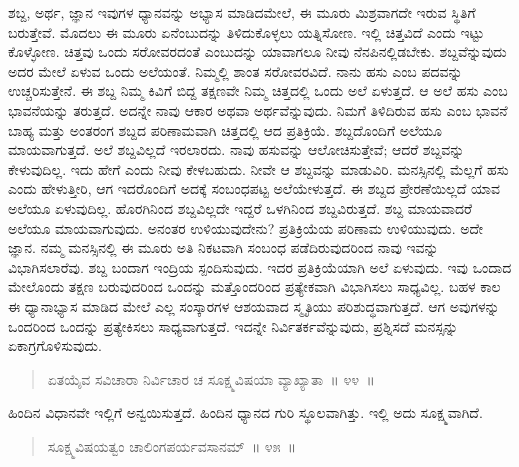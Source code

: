 ಶಬ್ದ, ಅರ್ಥ, ಜ್ಞಾನ ಇವುಗಳ ಧ್ಯಾನವನ್ನು ಅಭ್ಯಾಸ ಮಾಡಿದಮೇಲೆ, ಈ ಮೂರು ಮಿಶ್ರವಾಗದೇ ಇರುವ ಸ್ಥಿತಿಗೆ ಬರುತ್ತೇವೆ. ಮೊದಲು ಈ ಮೂರು ಏನೆಂಬುದನ್ನು ತಿಳಿದುಕೊಳ್ಳಲು ಯತ್ನಿಸೋಣ. ಇಲ್ಲಿ ಚಿತ್ತವಿದೆ ಎಂದು ಇಟ್ಟು ಕೊಳ್ಳೋಣ. ಚಿತ್ತವು ಒಂದು ಸರೋವರದಂತೆ ಎಂಬುದನ್ನು ಯಾವಾಗಲೂ ನೀವು ನೆನಪಿನಲ್ಲಿಡಬೇಕು. ಶಬ್ದವೆನ್ನುವುದು ಅದರ ಮೇಲೆ ಏಳುವ ಒಂದು ಅಲೆಯಂತೆ. ನಿಮ್ಮಲ್ಲಿ ಶಾಂತ ಸರೋವರವಿದೆ. ನಾನು ಹಸು ಎಂಬ ಪದವನ್ನು ಉಚ್ಚರಿಸುತ್ತೇನೆ. ಈ ಶಬ್ದ ನಿಮ್ಮ ಕಿವಿಗೆ ಬಿದ್ದ ತಕ್ಷಣವೇ ನಿಮ್ಮ ಚಿತ್ತದಲ್ಲಿ ಒಂದು ಅಲೆ ಏಳುತ್ತದೆ. ಆ ಅಲೆ ಹಸು ಎಂಬ ಭಾವನೆಯನ್ನು ತರುತ್ತದೆ. ಅದನ್ನೇ ನಾವು ಆಕಾರ ಅಥವಾ ಅರ್ಥವೆನ್ನುವುದು. ನಿಮಗೆ ತಿಳಿದಿರುವ ಹಸು ಎಂಬ ಭಾವನೆ ಬಾಹ್ಯ ಮತ್ತು ಅಂತರಂಗ ಶಬ್ದದ ಪರಿಣಾಮವಾಗಿ ಚಿತ್ತದಲ್ಲಿ ಆದ ಪ್ರತಿಕ್ರಿಯೆ. ಶಬ್ದದೊಂದಿಗೆ ಅಲೆಯೂ ಮಾಯವಾಗುತ್ತದೆ. ಅಲೆ ಶಬ್ದವಿಲ್ಲದೆ ಇರಲಾರದು. ನಾವು ಹಸುವನ್ನು ಆಲೋಚಿಸುತ್ತೇವೆ; ಆದರೆ ಶಬ್ದವನ್ನು ಕೇಳುವುದಿಲ್ಲ. ಇದು ಹೇಗೆ ಎಂದು ನೀವು ಕೇಳಬಹುದು. ನೀವೇ ಆ ಶಬ್ದವನ್ನು ಮಾಡುವಿರಿ. ಮನಸ್ಸಿನಲ್ಲಿ ಮೆಲ್ಲಗೆ ಹಸು ಎಂದು ಹೇಳುತ್ತೀರಿ, ಆಗ ಇದರೊಂದಿಗೆ ಅದಕ್ಕೆ ಸಂಬಂಧಪಟ್ಟ ಅಲೆಯೇಳುತ್ತದೆ. ಈ ಶಬ್ದದ ಪ್ರೇರಣೆಯಿಲ್ಲದೆ ಯಾವ ಅಲೆಯೂ ಏಳುವುದಿಲ್ಲ. ಹೊರಗಿನಿಂದ ಶಬ್ದವಿಲ್ಲದೇ ಇದ್ದರೆ ಒಳಗಿನಿಂದ ಶಬ್ದವಿರುತ್ತದೆ. ಶಬ್ದ ಮಾಯವಾದರೆ ಅಲೆಯೂ ಮಾಯವಾಗುವುದು. ಅನಂತರ ಉಳಿಯುವುದೇನು? ಪ್ರತಿಕ್ರಿಯೆಯ ಪರಿಣಾಮ ಉಳಿಯುವುದು. ಅದೇ ಜ್ಞಾನ. ನಮ್ಮ ಮನಸ್ಸಿನಲ್ಲಿ ಈ ಮೂರು ಅತಿ ನಿಕಟವಾಗಿ ಸಂಬಂಧ ಪಡೆದಿರುವುದರಿಂದ ನಾವು ಇವನ್ನು ವಿಭಾಗಿಸಲಾರೆವು. ಶಬ್ದ ಬಂದಾಗ ಇಂದ್ರಿಯ ಸ್ಪಂದಿಸುವುದು. ಇದರ ಪ್ರತಿಕ್ರಿಯೆಯಾಗಿ ಅಲೆ ಏಳುವುದು. ಇವು ಒಂದಾದ ಮೇಲೊಂದು ತಕ್ಷಣ ಬರುವುದರಿಂದ ಒಂದನ್ನು ಮತ್ತೊಂದರಿಂದ ಪ್ರತ್ಯೇಕವಾಗಿ ವಿಭಾಗಿಸಲು ಸಾಧ್ಯವಿಲ್ಲ. ಬಹಳ ಕಾಲ ಈ ಧ್ಯಾನಾಭ್ಯಾಸ ಮಾಡಿದ ಮೇಲೆ ಎಲ್ಲ ಸಂಸ್ಕಾರಗಳ ಆಶಯವಾದ ಸ್ಮೃತಿಯು ಪರಿಶುದ್ಧವಾಗುತ್ತದೆ. ಆಗ ಅವುಗಳನ್ನು ಒಂದರಿಂದ ಒಂದನ್ನು ಪ್ರತ್ಯೇಕಿಸಲು ಸಾಧ್ಯವಾಗುತ್ತದೆ. ಇದನ್ನೇ ನಿರ್ವಿತರ್ಕವೆನ್ನುವುದು, ಪ್ರಶ್ನಿಸದೆ ಮನಸ್ಸನ್ನು ಏಕಾಗ್ರಗೊಳಿಸುವುದು. 

\vspace{-0.3cm}

\begin{verse}
ಏತಯೈವ ಸವಿಚಾರಾ ನಿರ್ವಿಚಾರ ಚ ಸೂಕ್ಷ್ಮವಿಷಯಾ ವ್ಯಾಖ್ಯಾತಾ~॥ ೪೪~॥
\end{verse}

\vspace{-0.4cm}


\vspace{0.1cm}

ಹಿಂದಿನ ವಿಧಾನವೇ ಇಲ್ಲಿಗೆ ಅನ್ವಯಿಸುತ್ತದೆ. ಹಿಂದಿನ ಧ್ಯಾನದ ಗುರಿ ಸ್ಥೂಲವಾಗಿತ್ತು. ಇಲ್ಲಿ ಅದು ಸೂಕ್ಷ್ಮವಾಗಿದೆ. 

\vspace{-0.25cm}

\begin{verse}
ಸೂಕ್ಷ್ಮವಿಷಯತ್ವಂ ಚಾಲಿಂಗಪರ್ಯವಸಾನಮ್​~॥ ೪೫~॥
\end{verse}

\vspace{-0.4cm}

